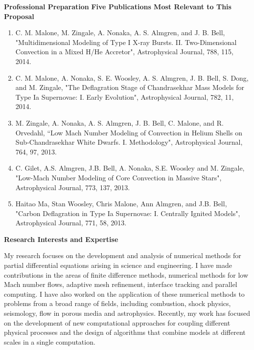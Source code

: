 \documentclass[11pt,letterpaper,english]{article}
\begin{document}
\begin{flushleft} {\bf Professional Preparation}
\vspace{.04in}
{\bf Five Publications Most Relevant to This Proposal}
\vspace{-6pt}
\begin{enumerate} \itemsep1pt \parskip0pt 
\item C. M. Malone, M. Zingale, A. Nonaka, A. S. Almgren, and J. B. Bell, "Multidimensional Modeling of Type I X-ray Bursts. II. Two-Dimensional Convection in a Mixed H/He Accretor", Astrophysical Journal, 788, 115, 2014. \\ 
\item C. M. Malone, A. Nonaka, S. E. Woosley, A. S. Almgren, J. B. Bell, S. Dong, and M. Zingale, "The Deflagration Stage of Chandrasekhar Mass Models for Type Ia Supernovae: I. Early Evolution", Astrophysical Journal, 782, 11, 2014. \\ 
\item M. Zingale, A. Nonaka, A. S. Almgren, J. B. Bell, C. Malone, and R. Orvedahl, ``Low Mach Number Modeling of Convection in Helium Shells on Sub-Chandrasekhar White Dwarfs. I. Methodology", Astrophysical Journal, 764, 97, 2013. \\
\item C. Gilet, A.S. Almgren, J.B. Bell, A. Nonaka, S.E. Woosley and M. Zingale, "Low-Mach Number Modeling of Core Convection in Massive Stars", Astrophysical Journal, 773, 137, 2013. \\ 
\item Haitao Ma, Stan Woosley, Chris Malone, Ann Almgren, and J.B. Bell, "Carbon Deflagration in Type Ia Supernovae: I. Centrally Ignited Models", Astrophysical Journal, 771, 58, 2013. \\ 
\end{enumerate} 

\vspace{-6pt}
{\bf Research Interests and Expertise}
{\parindent 16pt

My research focuses on the development and analysis of
numerical methods for partial differential equations arising in science and engineering.
I have made contributions in the areas of finite difference methods, numerical methods for low Mach number flows, adaptive mesh refinement, interface tracking and parallel computing.
I have also worked on the application of these numerical methods to problems
from a broad range of fields, including combustion, shock physics, seismology, flow in porous media and astrophysics. 
Recently, my work has focused on the development of new computational approaches for coupling different physical processes and the design of algorithms that combine models at different scales in a single computation.  

}
\end{flushleft}
\end{document}
